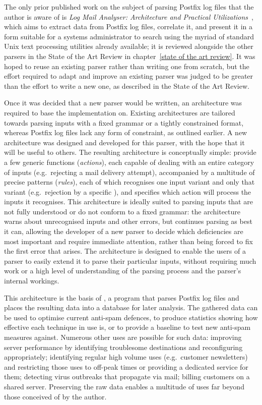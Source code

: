 The only prior published work on the subject of parsing Postfix log files
that the author is aware of is \textit{Log Mail Analyser: Architecture and
Practical Utilizations\/}~\cite{log-mail-analyser}, which aims to extract
data from Postfix log files, correlate it, and present it in a form
suitable for a systems administrator to search using the myriad of standard
Unix text processing utilities already available; it is reviewed alongside
the other parsers in the State of the Art Review in chapter~\ref{state of
the art review}.  It was hoped to reuse an existing parser rather than
writing one from scratch, but the effort required to adapt and improve an
existing parser was judged to be greater than the effort to write a new
one, as described in the State of the Art Review.

Once it was decided that a new parser would be written, an architecture was
required to base the implementation on.  Existing architectures are
tailored towards parsing inputs with a fixed grammar or a tightly
constrained format, whereas Postfix log files lack any form of constraint,
as outlined earlier.  A new architecture was designed and developed for
this parser, with the hope that it will be useful to others.  The resulting
architecture is conceptually simple: provide a few generic functions
(\textit{actions\/}), each capable of dealing with an entire category of
inputs (e.g.\ rejecting a mail delivery attempt), accompanied by a
multitude of precise patterns (\textit{rules\/}), each of which recognises
one input variant and only that variant (e.g.\ rejection by a specific
), and specifies which action will process the inputs it
recognises.  This architecture is ideally suited to parsing inputs that are
not fully understood or do not conform to a fixed grammar: the architecture
warns about unrecognised inputs and other errors, but continues parsing as
best it can, allowing the developer of a new parser to decide which
deficiencies are most important and require immediate attention, rather
than being forced to fix the first error that arises.
The architecture is designed to enable the users of a parser to
easily extend it to parse their particular inputs, without requiring much
work or a high level of understanding of the parsing process and the
parser's internal workings.

This architecture is the basis of \parsername{}, a program that parses
Postfix log files and places the resulting data into a 
database for later analysis.  The gathered data can be used to optimise
current anti-spam defences, to produce statistics showing how effective
each technique in use is, or to provide a baseline to test new anti-spam
measures against.  Numerous other uses are possible for such data:
improving server performance by identifying troublesome destinations and
reconfiguring appropriately; identifying regular high volume uses (e.g.\
customer newsletters) and restricting those uses to off-peak times or
providing a dedicated service for them; detecting virus outbreaks that
propagate via mail; billing customers on a shared server.  Preserving the
raw data enables a multitude of uses far beyond those conceived of by the
author.

